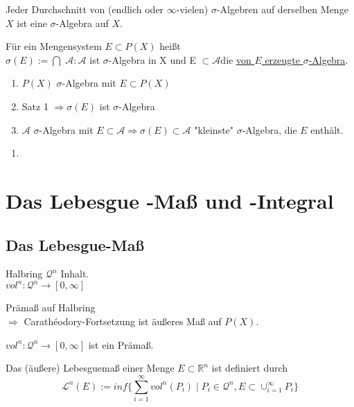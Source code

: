 \documentclass[11pt]{memoir}
\newcommand{\cara}{Carathéodory-Fortsetzung}
\begin{document}
\begin{Satz}
Jeder Durchschnitt von (endlich oder $\infty$-vielen) $\sigma$-Algebren auf derselben Menge $X$ ist eine $\sigma$-Algebra auf $X$.
\end{Satz}

\begin{Definition}
Für ein Mengensystem $E \subset P(X)$ heißt \\
$\sigma(E):=\bigcap$ \textbraceleft $\mathscr{A}: \mathscr{A}$ ist $\sigma$-Algebra in X und E $ \subset \mathscr{A}$\textbraceright die \underline{ von $E$ erzeugte $\sigma$-Algebra}.
\end{Definition}

\begin{Bemerkung}
\begin{enumerate}
	\item $P(X)$ $\sigma$-Algebra mit $E \subset P(X)$
	\item Satz 1 $\Rightarrow \sigma(E)$ ist $\sigma$-Algebra
	\item $\mathscr{A}$ $\sigma$-Algebra mit $E \subset \mathscr{A} \Rightarrow \sigma(E) \subset 		\mathscr{A}$ "kleinste"{} $\sigma$-Algebra, die $E$ enthält.
\end{enumerate}
\end{Bemerkung}

\begin{Beispiel}
\begin{enumerate}
	\item
\end{enumerate}
\end{Beispiel}

\chapter{Das Lebesgue -Maß und -Integral}
\section{Das Lebesgue-Maß}

Halbring $\mathcal{Q}^n$ Inhalt.\\
$vol^n : \mathcal{Q}^n \rightarrow [0, \infty]$

\begin{Satz}
	Prämaß auf Halbring\\
	$\Rightarrow$ \cara{} ist äußeres Maß auf $P(X)$.
\end{Satz}

\begin{Lemma}
	$vol^n : \mathcal{Q}^n \rightarrow [0, \infty]$ ist ein Prämaß.
\end{Lemma}

\begin{Definition}
	Das (äußere) Lebesguemaß einer Menge $E \subset \mathbb{R}^n$ ist definiert durch\\
	$$ \mathscr{L}^n(E) := inf\{ \sum_{i = 1}^{\infty} vol^n(P_i) \mid P_i \in \mathscr{Q}^n, E \subset \cup_{i = 1}^{\infty} P_i \} $$
\end{Definition}
\end{document}
